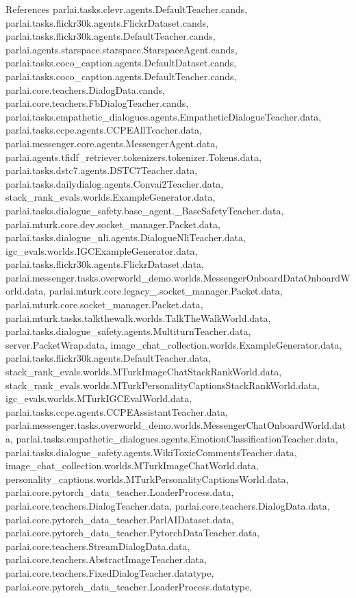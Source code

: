 References parlai.\+tasks.\+clevr.\+agents.\+Default\+Teacher.\+cands, parlai.\+tasks.\+flickr30k.\+agents.\+Flickr\+Dataset.\+cands, parlai.\+tasks.\+flickr30k.\+agents.\+Default\+Teacher.\+cands, parlai.\+agents.\+starspace.\+starspace.\+Starspace\+Agent.\+cands, parlai.\+tasks.\+coco\+\_\+caption.\+agents.\+Default\+Dataset.\+cands, parlai.\+tasks.\+coco\+\_\+caption.\+agents.\+Default\+Teacher.\+cands, parlai.\+core.\+teachers.\+Dialog\+Data.\+cands, parlai.\+core.\+teachers.\+Fb\+Dialog\+Teacher.\+cands, parlai.\+tasks.\+empathetic\+\_\+dialogues.\+agents.\+Empathetic\+Dialogue\+Teacher.\+data, parlai.\+tasks.\+ccpe.\+agents.\+C\+C\+P\+E\+All\+Teacher.\+data, parlai.\+messenger.\+core.\+agents.\+Messenger\+Agent.\+data, parlai.\+agents.\+tfidf\+\_\+retriever.\+tokenizers.\+tokenizer.\+Tokens.\+data, parlai.\+tasks.\+dstc7.\+agents.\+D\+S\+T\+C7\+Teacher.\+data, parlai.\+tasks.\+dailydialog.\+agents.\+Convai2\+Teacher.\+data, stack\+\_\+rank\+\_\+evals.\+worlds.\+Example\+Generator.\+data, parlai.\+tasks.\+dialogue\+\_\+safety.\+base\+\_\+agent.\+\_\+\+Base\+Safety\+Teacher.\+data, parlai.\+mturk.\+core.\+dev.\+socket\+\_\+manager.\+Packet.\+data, parlai.\+tasks.\+dialogue\+\_\+nli.\+agents.\+Dialogue\+Nli\+Teacher.\+data, igc\+\_\+evals.\+worlds.\+I\+G\+C\+Example\+Generator.\+data, parlai.\+tasks.\+flickr30k.\+agents.\+Flickr\+Dataset.\+data, parlai.\+messenger.\+tasks.\+overworld\+\_\+demo.\+worlds.\+Messenger\+Onboard\+Data\+Onboard\+World.\+data, parlai.\+mturk.\+core.\+legacy\+\_.\+socket\+\_\+manager.\+Packet.\+data, parlai.\+mturk.\+core.\+socket\+\_\+manager.\+Packet.\+data, parlai.\+mturk.\+tasks.\+talkthewalk.\+worlds.\+Talk\+The\+Walk\+World.\+data, parlai.\+tasks.\+dialogue\+\_\+safety.\+agents.\+Multiturn\+Teacher.\+data, server.\+Packet\+Wrap.\+data, image\+\_\+chat\+\_\+collection.\+worlds.\+Example\+Generator.\+data, parlai.\+tasks.\+flickr30k.\+agents.\+Default\+Teacher.\+data, stack\+\_\+rank\+\_\+evals.\+worlds.\+M\+Turk\+Image\+Chat\+Stack\+Rank\+World.\+data, stack\+\_\+rank\+\_\+evals.\+worlds.\+M\+Turk\+Personality\+Captions\+Stack\+Rank\+World.\+data, igc\+\_\+evals.\+worlds.\+M\+Turk\+I\+G\+C\+Eval\+World.\+data, parlai.\+tasks.\+ccpe.\+agents.\+C\+C\+P\+E\+Assistant\+Teacher.\+data, parlai.\+messenger.\+tasks.\+overworld\+\_\+demo.\+worlds.\+Messenger\+Chat\+Onboard\+World.\+data, parlai.\+tasks.\+empathetic\+\_\+dialogues.\+agents.\+Emotion\+Classification\+Teacher.\+data, parlai.\+tasks.\+dialogue\+\_\+safety.\+agents.\+Wiki\+Toxic\+Comments\+Teacher.\+data, image\+\_\+chat\+\_\+collection.\+worlds.\+M\+Turk\+Image\+Chat\+World.\+data, personality\+\_\+captions.\+worlds.\+M\+Turk\+Personality\+Captions\+World.\+data, parlai.\+core.\+pytorch\+\_\+data\+\_\+teacher.\+Loader\+Process.\+data, parlai.\+core.\+teachers.\+Dialog\+Teacher.\+data, parlai.\+core.\+teachers.\+Dialog\+Data.\+data, parlai.\+core.\+pytorch\+\_\+data\+\_\+teacher.\+Parl\+A\+I\+Dataset.\+data, parlai.\+core.\+pytorch\+\_\+data\+\_\+teacher.\+Pytorch\+Data\+Teacher.\+data, parlai.\+core.\+teachers.\+Stream\+Dialog\+Data.\+data, parlai.\+core.\+teachers.\+Abstract\+Image\+Teacher.\+data, parlai.\+core.\+teachers.\+Fixed\+Dialog\+Teacher.\+datatype, parlai.\+core.\+pytorch\+\_\+data\+\_\+teacher.\+Loader\+Process.\+datatype, 
